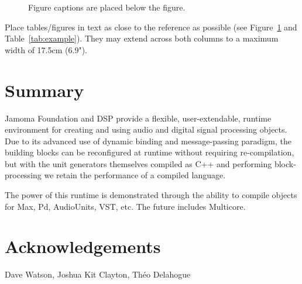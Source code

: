 \documentclass[twoside,10pt]{article}
\begin{document}
\begin{figure}[htbp]
\centerline{}
\caption{Figure captions are placed below the figure.}
\label{fig:example}
\end{figure}
Place tables/figures in text as close to the reference as possible
(see Figure~\ref{fig:example} and Table~\ref{tab:example}). They may extend
across both columns to a maximum width of 17.5cm (6.9").




\section{Summary} %

Jamoma Foundation and DSP provide a flexible, user-extendable, runtime environment for creating and using audio and digital signal processing objects.  Due to its advanced use of dynamic binding and message-passing paradigm, the building blocks can be reconfigured at runtime without requiring re-compilation, but with the unit generators themselves compiled as C++ and performing block-processing we retain the performance of a compiled language.

The power of this runtime is demonstrated through the ability to compile objects for Max, Pd, AudioUnits, VST, etc.  The future includes Multicore.




\section{Acknowledgements} %

Dave Watson, Joshua Kit Clayton, Théo Delahogue




\end{document}
